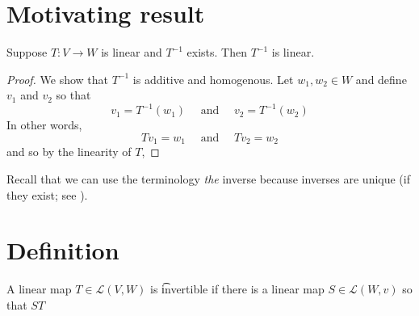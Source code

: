 
\section*{Motivating result}

\begin{proposition}
Suppose $T: V \to W$ is linear and $T^{-1}$ exists.
Then $T^{-1}$ is linear.
\end{proposition}

\begin{proof}We show that $T^{-1}$ is additive and homogenous.
Let $w_1, w_2 \in W$ and define $v_1$ and $v_2$ so that
\[
v_1 = T^{-1}(w_1) \quad \text{ and } \quad v_2 = T^{-1}(w_2)
\]
In other words,
\[
Tv_1 = w_1 \quad \text{ and } \quad Tv_2 = w_2
\]
and so by the linearity of $T$,\end{proof}
Recall that we can use the terminology \textit{the} inverse because inverses are unique (if they exist; see ).
\section*{Definition}

A linear map $T \in \mathcal{L} (V, W)$ is \t{invertible} if there is a linear map $S \in \mathcal{L} (W, v)$ so that $ST$

\blankpage